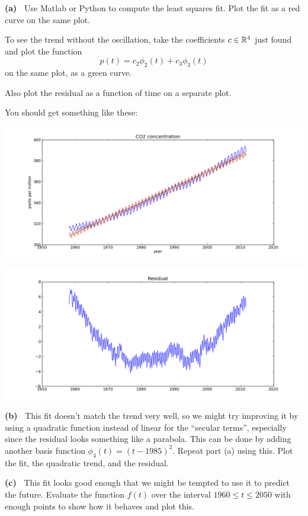 \documentclass[10pt]{article}
\begin{document}
{\bf (a)~} 
Use Matlab or Python to compute the least squares fit. 
Plot the fit as a red curve on the same plot. 

To see the trend without the oscillation, take the coefficients
$c\in\mathbb{R}^4$ just found and plot the function
\[
p(t) = c_2\phi_2(t) + c_3\phi_3(t) 
\]
on the same plot, as a green curve.  

Also plot the residual as a function of time on a separate plot.

You should get something like these:

\centerline{\includegraphics[width=5.5in]{co2figure1.png}}

\centerline{\includegraphics[width=5.5in]{co2resid1.png}}



{\bf (b)~} This fit doesn't match the trend very well, so we might try
improving it by using a quadratic function instead of linear for the
``secular terms'', especially
since the residual looks something like a parabola.  This can be
done by adding another basis function $\phi_4(t) = (t-1985)^2$.  Repeat part
(a) using this.  Plot the fit, the quadratic trend, and the residual.

{\bf (c)~} 
This fit looks good enough that we might be tempted to use it to predict the
future.  Evaluate the function $f(t)$ over the interval $1960 \leq t \leq
2050$ with enough points to show how it behaves and plot this.
\end{document}
